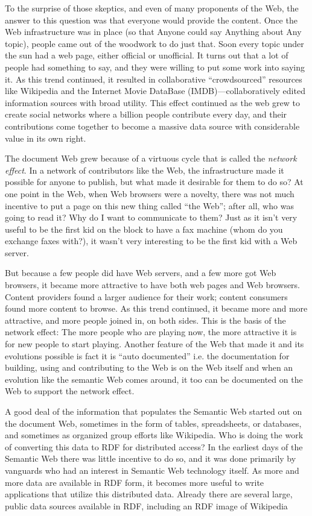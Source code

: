 To the surprise of those skeptics, and even of many proponents of the
Web, the answer to this question was that everyone would provide the
content. Once the Web infrastructure was in place (so that Anyone could
say Anything about Any topic), people came out of the woodwork to do
just that. Soon every topic under the sun had a web page, either
official or unofficial. It turns out that a lot of people had something
to say, and they were willing to put some work into saying it. As this
trend continued, it resulted in collaborative ``crowdsourced'' resources
like Wikipedia and the Internet Movie DataBase (IMDB)---collaboratively
edited information sources with broad utility. This effect continued as
the web grew to create social networks where a billion people contribute
every day, and their contributions come together to become a massive
data source with considerable value in its own right.

The document Web grew because of a virtuous cycle that is called the
\emph{network effect}. In a network of contributors like the Web, the
infrastructure made it possible for anyone to publish, but what made it
desirable for them to do so? At one point in the Web, when Web browsers
were a novelty, there was not much incentive to put a page on this new
thing called ``the Web''; after all, who was going to read it? Why do I
want to communicate to them? Just as it isn't very useful to be the
first kid on the block to have a fax machine (whom do you exchange faxes
with?), it wasn't very interesting to be the first kid with a Web
server.

But because a few people did have Web servers, and a few more got Web
browsers, it became more attractive to have both web pages and Web
browsers. Content providers found a larger audience for their work;
content consumers found more content to browse. As this trend continued,
it became more and more attractive, and more people joined in, on both
sides. This is the basis of the network effect: The more people who are
playing now, the more attractive it is for new people to start playing.
Another feature of the Web that made it and its evolutions possible is
fact it is ``auto documented'' i.e. the documentation for building,
using and contributing to the Web is on the Web itself and when an
evolution like the semantic Web comes around, it too can be documented
on the Web to support the network effect.

A good deal of the information that populates the Semantic Web started
out on the document Web, sometimes in the form of tables, spreadsheets,
or databases, and sometimes as organized group efforts like Wikipedia.
Who is doing the work of converting this data to RDF for distributed
access? In the earliest days of the Semantic Web there was little
incentive to do so, and it was done primarily by vanguards who had an
interest in Semantic Web technology itself. As more and more data are
available in RDF form, it becomes more useful to write applications that
utilize this distributed data. Already there are several large, public
data sources available in RDF, including an RDF image of Wikipedia

